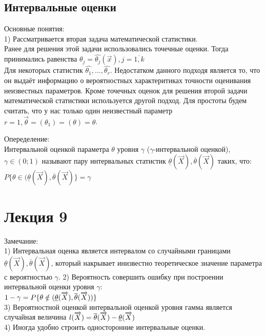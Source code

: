 \section{Интервальные оценки}
Основные понятия:\\
1) Рассматривается вторая задача математической статистики.\\

Ранее для решения этой задачи использовались точечные оценки. Тогда принимались равенства $\theta_{j} = \hat{\theta_{j}}(\overrightarrow{x}), j = \overline{1, k}$\\
Для некоторых статистик $\hat{\theta_{1}}, ..., \hat{\theta_{r}}$. Недостатком данного подходя является то, что он выдаёт информацию о вероятностных характеритиках точности оценивания неизвестных параметров. Кроме точечных оценок для решения второй задачи математической статистики используется другой подход. Для простоты будем считать, что у нас только один неизвестный параметр $r = 1, \overrightarrow{\theta} = (\theta_{1}) = (\theta) = \theta$.

Опеределение:\\
Интервальной оценкой параметра $\theta$ уровня $\gamma$ ($\gamma$-интервальной оценкой), $\gamma \in (0;1)$ называют пару интервальных статистик $\underline{\theta}(\overrightarrow{X}), \overline{\theta}(\overrightarrow{X})$ таких, что:\\
$P\{\theta \in (\underline{\theta}(\overrightarrow{X}), \overline{\theta}(\overrightarrow{X})\} = \gamma$\\

\chapter{Лекция 9}
Замечание:\\
1) Интервальная оценка является интервалом со случайными границами $\underline{\theta}(\overrightarrow{X}), \overline{\theta}(\overrightarrow{X})$, который  накрывает инизвестно теоретическое значение параметра с вероятностью $\gamma$.
2) Вероятность совершить ошибку при построении интервальной оценки уровня $\gamma$:\\
$1 - \gamma = P\{\theta \notin (\underline{\theta}(\overrightarrow{X}), \overline{\theta}(\overrightarrow{X}))\}$\\
3) Вероятностной оценкой интервальной оценкой уровня гамма является случайная величина $l(\overrightarrow{X}) = \overline{\theta}(\overrightarrow{X}) - \underline{\theta}(\overrightarrow{X})$\\
4) Иногда удобно строить односторонние интервальные оценки.

